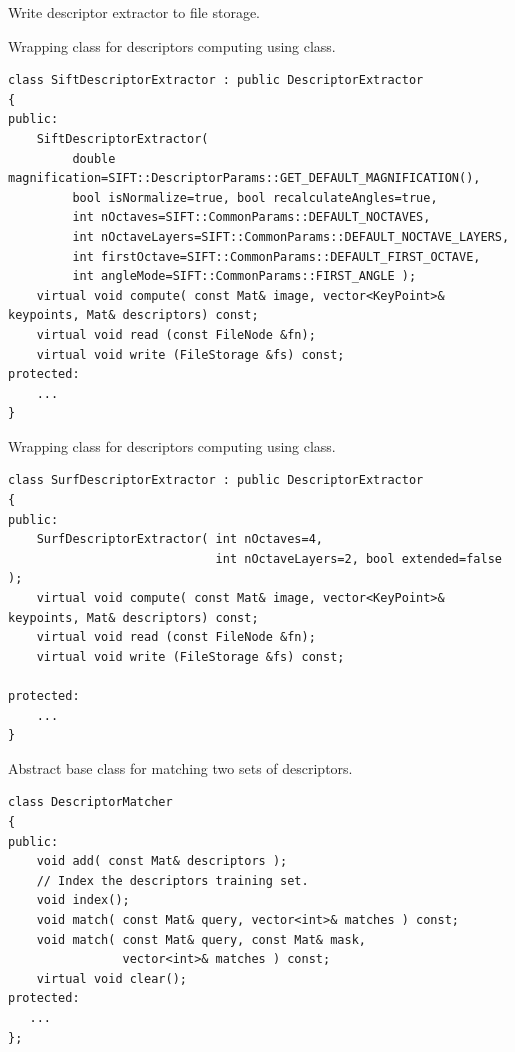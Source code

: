 Write descriptor extractor to file storage.


\begin{description}
\end{description}

Wrapping class for descriptors computing using  class.

\begin{lstlisting}
class SiftDescriptorExtractor : public DescriptorExtractor
{
public:
    SiftDescriptorExtractor( 
	     double magnification=SIFT::DescriptorParams::GET_DEFAULT_MAGNIFICATION(),
	     bool isNormalize=true, bool recalculateAngles=true,
	     int nOctaves=SIFT::CommonParams::DEFAULT_NOCTAVES,
	     int nOctaveLayers=SIFT::CommonParams::DEFAULT_NOCTAVE_LAYERS,
	     int firstOctave=SIFT::CommonParams::DEFAULT_FIRST_OCTAVE,
	     int angleMode=SIFT::CommonParams::FIRST_ANGLE );
    virtual void compute( const Mat& image, vector<KeyPoint>& keypoints, Mat& descriptors) const;
    virtual void read (const FileNode &fn);
    virtual void write (FileStorage &fs) const;
protected:
    ...
}
\end{lstlisting}

Wrapping class for descriptors computing using  class.

\begin{lstlisting}
class SurfDescriptorExtractor : public DescriptorExtractor
{
public:
    SurfDescriptorExtractor( int nOctaves=4,
                             int nOctaveLayers=2, bool extended=false );
    virtual void compute( const Mat& image, vector<KeyPoint>& keypoints, Mat& descriptors) const;
    virtual void read (const FileNode &fn);
    virtual void write (FileStorage &fs) const;
   
protected:
    ...
}
\end{lstlisting}

Abstract base class for matching two sets of descriptors.

\begin{lstlisting}
class DescriptorMatcher
{
public:
    void add( const Mat& descriptors );
    // Index the descriptors training set.
    void index();
    void match( const Mat& query, vector<int>& matches ) const;
	void match( const Mat& query, const Mat& mask,
	            vector<int>& matches ) const;
    virtual void clear();
protected:
   ...
};
\end{lstlisting} 

